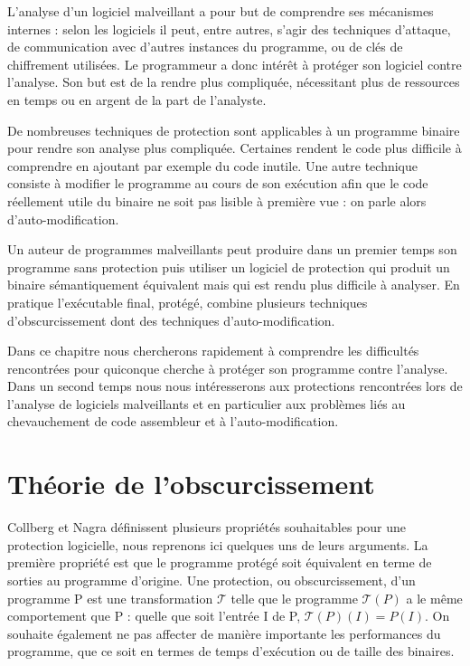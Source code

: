 L'analyse d'un logiciel malveillant a pour but de comprendre ses mécanismes internes : selon les logiciels il peut, entre autres, s'agir des techniques d'attaque, de communication avec d'autres instances du programme, ou de clés de chiffrement utilisées. Le programmeur a donc intérêt à protéger son logiciel contre l'analyse. Son but est de la rendre plus compliquée, nécessitant plus de ressources en temps ou en argent de la part de l'analyste.

De nombreuses techniques de protection sont applicables à un programme binaire pour rendre son analyse plus compliquée. Certaines rendent le code plus difficile à comprendre en ajoutant par exemple du code inutile. Une autre technique consiste à modifier le programme au cours de son exécution afin que le code réellement utile du binaire ne soit pas lisible à première vue : on parle alors d'auto-modification.

Un auteur de programmes malveillants peut produire dans un premier temps son programme sans protection puis utiliser un logiciel de protection qui produit un binaire sémantiquement équivalent mais qui est rendu plus difficile à analyser. En pratique l'exécutable final, protégé, combine plusieurs techniques d'obscurcissement dont des techniques d'auto-modification.

Dans ce chapitre nous chercherons rapidement à comprendre les difficultés rencontrées pour quiconque cherche à protéger son programme contre l'analyse. Dans un second temps nous nous intéresserons aux protections rencontrées lors de l'analyse de logiciels malveillants et en particulier aux problèmes liés au chevauchement de code assembleur et à l'auto-modification.



\section{Théorie de l'obscurcissement}
Collberg et Nagra \cite{nagra2009surreptitious} définissent plusieurs propriétés souhaitables pour une protection logicielle, nous reprenons ici quelques uns de leurs arguments. La première propriété est que le programme protégé soit équivalent en terme de sorties au programme d'origine.
Une protection, ou obscurcissement, d'un programme P est une transformation $\mathcal{T}$ telle que le programme $\mathcal{T}(P)$ a le même comportement que P : quelle que soit l'entrée I de P, $\mathcal{T}(P)(I)=P(I)$.
On souhaite également ne pas affecter de manière importante les performances du programme, que ce soit en termes de temps d'exécution ou de taille des binaires.

